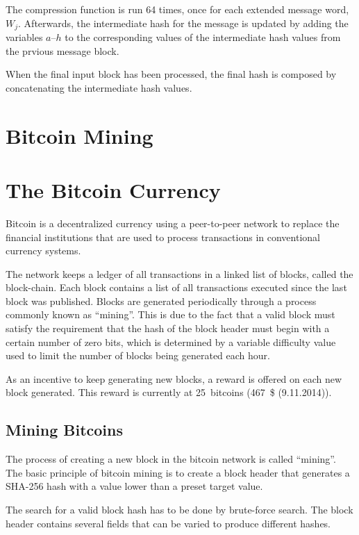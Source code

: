The compression function is run 64 times, once for each extended message word,
$W_j$. Afterwards, the intermediate hash for the message is updated by adding the
variables $a$--$h$ to the corresponding values of the intermediate hash values from
the prvious message block.

When the final input block has been processed, the final hash is composed by
concatenating the intermediate hash values.

\section{Bitcoin Mining}

\section{The Bitcoin Currency}
Bitcoin is a decentralized currency using a peer-to-peer network to replace
the financial institutions that are used to process transactions in conventional
currency systems.

The network keeps a ledger of all transactions in a linked list of blocks, called the
block-chain. Each block contains a list of all transactions executed since the last
block was published. Blocks are generated periodically through a process
commonly known as ``mining''. This is due to the fact that a valid block must satisfy
the requirement that the hash of the block header must begin with a certain number of
zero bits, which is determined by a variable difficulty value used to limit the number
of blocks being generated each hour\cite{bitcoin}.

As an incentive to keep generating new blocks, a reward is offered on each new block
generated. This reward is currently at 25~bitcoins (467~\$ (9.11.2014)).


\subsection{Mining Bitcoins}
The process of creating a new block in the bitcoin network is called ``mining''. The basic
principle of bitcoin mining is to create a block header that generates a SHA-256 hash with
a value lower than a preset target value.

The search for a valid block hash has to be done by brute-force search. The block header
contains several fields that can be varied to produce different hashes.

